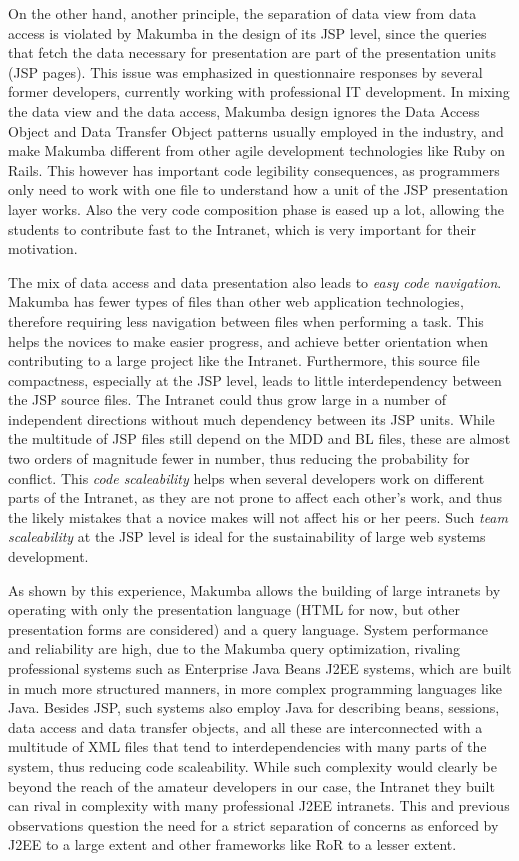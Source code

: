 \documentclass{llncs}
\begin{document}
On the other hand, another principle, the separation of data view from data access is violated by Makumba in the design of its JSP level, since the queries that fetch the data necessary for presentation are part of the presentation units (JSP pages). This issue was emphasized in questionnaire responses by several former developers, currently working with professional IT development. In mixing the data view and the data access, Makumba design ignores the Data Access Object and Data Transfer Object patterns usually employed in the industry, and make Makumba different from other agile development technologies like Ruby on Rails. This however has important code legibility consequences, as programmers only need to work with one file to understand how a unit of the JSP presentation layer works. Also the very code composition phase is eased up a lot, allowing the students to contribute fast to the Intranet, which is very important for their motivation. 

The mix of data access and data presentation also leads to \textit{easy code navigation}.  Makumba has fewer types of files than other web application technologies, therefore requiring less navigation between files when performing a task. This helps the novices to make easier progress, and achieve better orientation when contributing to a large project like the Intranet. Furthermore, this source file compactness, especially at the JSP level, leads to little interdependency between the JSP source files. The Intranet could thus grow large in a number of independent directions without much dependency between its JSP units. While the multitude of JSP files still depend on the MDD and BL files, these are almost two orders of magnitude fewer in number, thus reducing the probability for conflict. This \textit{code scaleability}  helps when several developers work on different parts of the Intranet, as they are not prone to affect each other's work, and thus the likely mistakes that a novice makes will not affect his or her peers. Such \textit{team scaleability} at the JSP level is ideal for the sustainability of large web systems development.

As shown by this experience, Makumba allows the building of large intranets by operating with only the presentation language (HTML for now, but other presentation forms are considered) and a query language. System performance and reliability are high, due to the Makumba query optimization, rivaling professional systems such as Enterprise Java Beans J2EE systems,  which are built in much more structured manners, in more complex programming languages like Java.  Besides JSP, such systems also employ Java for describing beans, sessions, data access and data transfer objects, and all these are interconnected with a multitude of XML files that tend to interdependencies with many parts of the system, thus reducing code scaleability. While such complexity would clearly be beyond the reach of the amateur developers in our case, the Intranet they built can rival in complexity with many professional J2EE intranets. This and previous observations question the need for a strict separation of concerns as enforced by J2EE to a large extent and other frameworks like RoR to a lesser extent.
\end{document}
